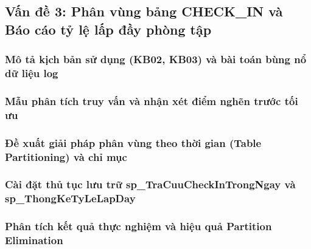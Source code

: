 \subsection{Vấn đề 3: Phân vùng bảng CHECK\_IN và Báo cáo tỷ lệ lấp đầy phòng tập}

\subsubsection{Mô tả kịch bản sử dụng (KB02, KB03) và bài toán bùng nổ dữ liệu log}

\subsubsection{Mẫu phân tích truy vấn và nhận xét điểm nghẽn trước tối ưu}

\subsubsection{Đề xuất giải pháp phân vùng theo thời gian (Table Partitioning) và chỉ mục}

\subsubsection{Cài đặt thủ tục lưu trữ sp\_TraCuuCheckInTrongNgay và sp\_ThongKeTyLeLapDay}

\subsubsection{Phân tích kết quả thực nghiệm và hiệu quả Partition Elimination}
